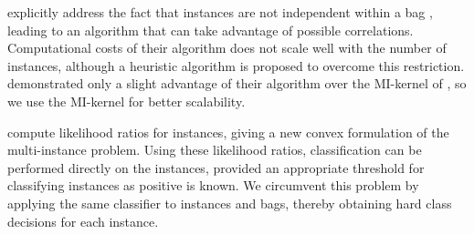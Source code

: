 \citet{zhou2009multi} explicitly address the fact that instances are not
independent within a bag , leading to an algorithm that can take advantage of
possible correlations. Computational costs of their algorithm does not scale
well with the number of instances, although a heuristic algorithm is proposed
to overcome this restriction. 
\citet{zhou2009multi} demonstrated only a slight
advantage of their algorithm over the MI-kernel of \citet{gaertner2002multi},
so we use the MI-kernel for better scalability.

\citet{liconvex2010} compute likelihood ratios for instances, giving a new
convex formulation of the multi-instance problem.  Using these likelihood
ratios, classification can be performed directly on the instances, provided an
appropriate threshold for classifying instances as positive is known. We
circumvent this problem by applying the same classifier to instances and bags,
thereby obtaining hard class decisions for each instance.




